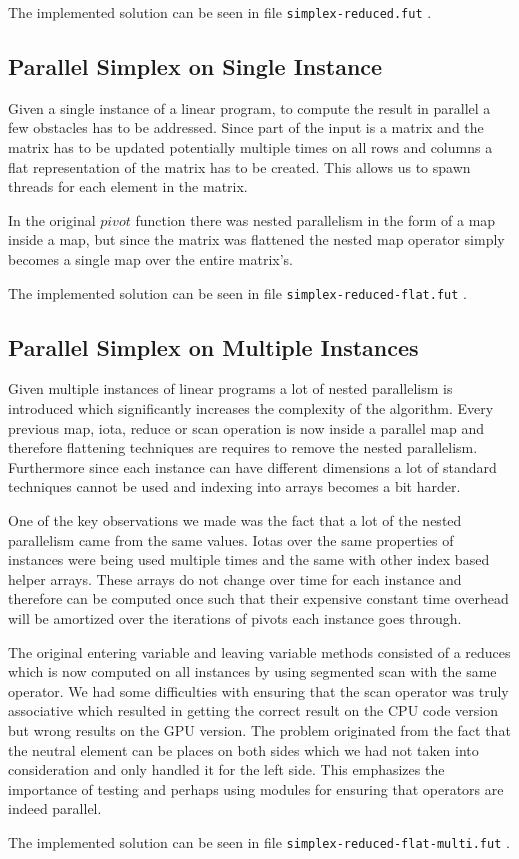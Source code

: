 The implemented solution can be seen in file \texttt{simplex-reduced.fut} .

\subsection{Parallel Simplex on Single Instance}
Given a single instance of a linear program, to compute the result in parallel a few obstacles has to be addressed. Since part of the input is a matrix and the matrix has to be updated potentially multiple times on all rows and columns a flat representation of the matrix has to be created. This allows us to spawn threads for each element in the matrix. 

In the original $pivot$ function there was nested parallelism in the form of a map inside a map, but since the matrix was flattened the nested map operator simply becomes a single map over the entire matrix's. 

The implemented solution can be seen in file \texttt{simplex-reduced-flat.fut} .

\subsection{Parallel Simplex on Multiple Instances}
Given multiple instances of linear programs a lot of nested parallelism is introduced which significantly increases the complexity of the algorithm. Every previous map, iota, reduce or scan operation is now inside a parallel map and therefore flattening techniques are requires to remove the nested parallelism. Furthermore since each instance can have different dimensions a lot of standard techniques cannot be used and indexing into arrays becomes a bit harder. 

One of the key observations we made was the fact that a lot of the nested parallelism came from the same values. Iotas over the same properties of instances were being used multiple times and the same with other index based helper arrays. These arrays do not change over time for each instance and therefore can be computed once such that their expensive constant time overhead will be amortized over the iterations of pivots each instance goes through. 

The original entering variable and leaving variable methods consisted of a reduces which is now computed on all instances by using segmented scan with the same operator. We had some difficulties with ensuring that the scan operator was truly associative which resulted in getting the correct result on the CPU code version but wrong results on the GPU version. The problem originated from the fact that the neutral element can be places on both sides which we had not taken into consideration and only handled it for the left side. This emphasizes the importance of testing and perhaps using modules for ensuring that operators are indeed parallel.  

The implemented solution can be seen in file \texttt{simplex-reduced-flat-multi.fut} .